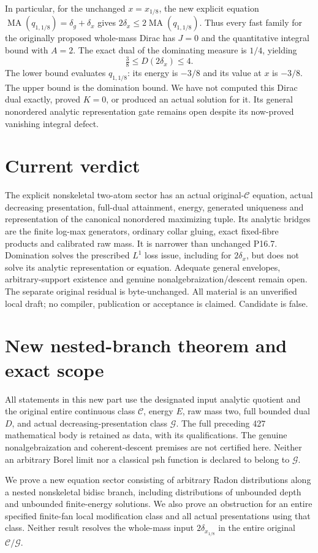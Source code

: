 \documentclass[11pt]{article}
\newcommand{\MA}{\operatorname{MA}}
\newcommand{\C}{\mathcal C}
\begin{document}
In particular, for the unchanged $x=x_{1/8}$, the new explicit equation
$\MA(q_{1,1/8})=\delta_g+\delta_x$ gives
$2\delta_x\le2\MA(q_{1,1/8})$.
Thus every fast family for the originally proposed whole-mass Dirac
has $J=0$ and the quantitative integral bound with $A=2$.
The exact dual of the dominating measure is $1/4$, yielding
\[
 \tfrac38\le D(2\delta_x)\le4.
\]
The lower bound evaluates $q_{1,1/8}$: its energy is $-3/8$ and
its value at $x$ is $-3/8$. The upper bound is the domination bound.
We have not computed this Dirac dual exactly, proved $K=0$, or produced
an actual solution for it. Its general nonordered analytic representation
gate remains open despite its now-proved vanishing integral defect.

\section{Current verdict}
The explicit nonskeletal two-atom sector has an actual original-$\C$
equation, actual decreasing presentation, full-dual attainment, energy,
generated uniqueness and representation of the canonical nonordered
maximizing tuple. Its analytic bridges are the finite log-max generators,
ordinary collar gluing, exact fixed-fibre products and calibrated raw mass.
It is narrower than unchanged P16.7. Domination solves the prescribed
$L^1$ loss issue, including for $2\delta_x$, but does not solve its
analytic representation or equation. Adequate general envelopes,
arbitrary-support existence and genuine nonalgebraization/descent remain
open. The separate original residual is byte-unchanged. All material is
an unverified local draft; no compiler, publication or acceptance is claimed.
Candidate is false.

\section{New nested-branch theorem and exact scope}
All statements in this new part use the designated input analytic quotient
and the original entire continuous class $\C$, energy $E$, raw mass two,
full bounded dual $D$, and actual decreasing-presentation class $\mathcal G$.
The full preceding 427 mathematical body is retained as data, with its
qualifications. The genuine nonalgebraization and coherent-descent premises
are not certified here. Neither an arbitrary Borel limit nor a classical
psh function is declared to belong to $\mathcal G$.

We prove a new equation sector consisting of arbitrary Radon distributions
along a nested nonskeletal bidisc branch, including distributions of
unbounded depth and unbounded finite-energy solutions. We also prove an
obstruction for an entire specified finite-fan local modification class and
all actual presentations using that class. Neither result resolves the
whole-mass input $2\delta_{x_{1/8}}$ in the entire original $\C/\mathcal G$.
\end{document}
